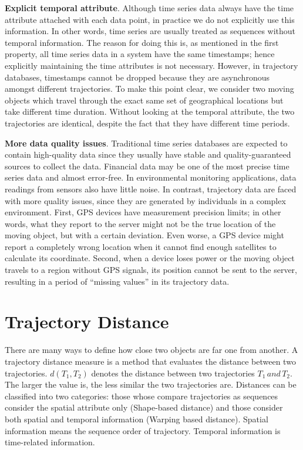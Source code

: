 \documentclass[a4paper, 12pt]{article}
\begin{document}
\textbf{Explicit temporal attribute}. Although time series data always have the time attribute attached with each data point, in practice we do not explicitly use this information. In other words, time series are usually treated as sequences without temporal information. The reason for doing this is, as mentioned in the first property, all time series data in a system have the same timestamps; hence explicitly maintaining the time attributes is not necessary. However, in trajectory databases, timestamps cannot be dropped because they are asynchronous amongst different trajectories. To make this point clear, we consider two moving objects which travel through the exact same set of geographical locations but take different time duration. Without looking at the temporal attribute, the two trajectories are identical, despite the fact that they have different time periods.

\textbf{More data quality issues}. Traditional time series databases are expected to contain high-quality data since they usually have stable and quality-guaranteed sources to collect the data. Financial data may be one of the most precise time series data and almost error-free. In environmental monitoring applications, data readings from sensors also have little noise. In contrast, trajectory data are faced with more quality issues, since they are generated by individuals in a complex environment. First, GPS devices have measurement precision limits; in other words, what they report to the server might not be the true location of the moving object, but with a certain deviation. Even worse, a GPS device might report a completely wrong location when it cannot find enough satellites to calculate its coordinate. Second, when a device loses power or the moving object travels to a region without GPS signals, its position cannot be sent to the server, resulting in a period of “missing values” in its trajectory data.

\section{Trajectory Distance}
There are many ways to define how close two objects are far one from another. A trajectory distance measure is a method that evaluates the distance between two trajectories. $d(T_{1},T_{2})$ denotes the distance between two trajectories $T_{1}\,and\,T_{2}$. The larger the value is, the less similar the two trajectories are. Distances can be classified into two categories: those whose compare trajectories as sequences consider the spatial attribute only (Shape-based distance) and those consider both spatial and temporal information (Warping based distance). Spatial information means the sequence order of trajectory. Temporal information is time-related information.
\end{document}
